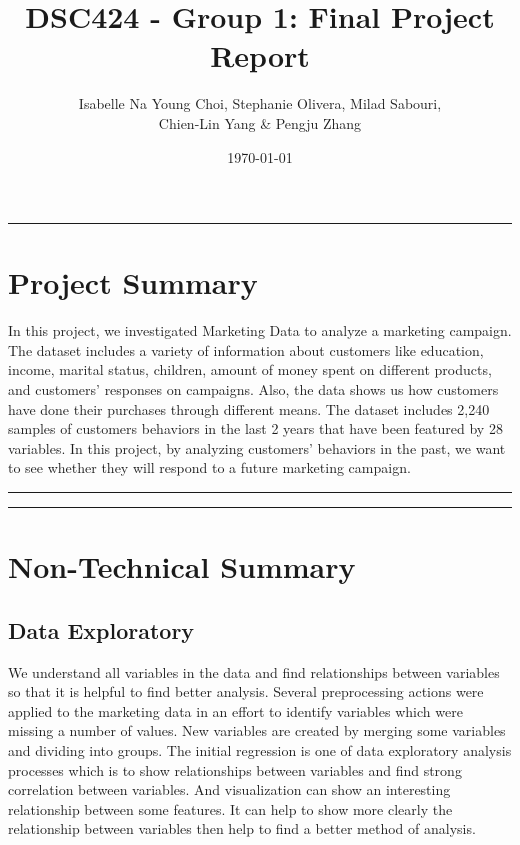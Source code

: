 \documentclass[11pt]{article} %
\title{DSC424 - Group 1: Final Project Report}
\date{\today}
\author{Isabelle Na Young Choi, Stephanie Olivera, Milad Sabouri, \\
Chien-Lin Yang \& Pengju Zhang}
\begin{document}

\maketitle %


\noindent\rule{\linewidth}{\arrayrulewidth}

\section*{Project Summary}
In this project, we investigated Marketing Data\cite{githubLink} to analyze a marketing campaign. The dataset includes a variety of information about customers like education, income, marital status, children, amount of money spent on different products, and customers' responses on campaigns. Also, the data shows us how customers have done their purchases through different means. The dataset includes 2,240 samples of customers behaviors in the last 2 years that have been featured by 28 variables. In this project, by analyzing customers' behaviors in the past, we want to see whether they will respond to a future marketing campaign. 

\noindent\rule{\linewidth}{\arrayrulewidth}

\clearpage
\tableofcontents
\noindent\rule{\linewidth}{\arrayrulewidth}

\newpage
\section{Non-Technical Summary}
\subsection{Data Exploratory}
We understand all variables in the data and find relationships between variables so that it is helpful to find better analysis. Several preprocessing actions were applied to the marketing data in an effort to identify variables which were missing a number of values. New variables are created by merging some variables and dividing into groups. The initial regression is one of data exploratory analysis processes which is to show relationships between variables and find strong correlation between variables. And visualization can show an interesting relationship between some features. It can help to show more clearly the relationship between variables then help to find a better method of analysis. 
\end{document}
